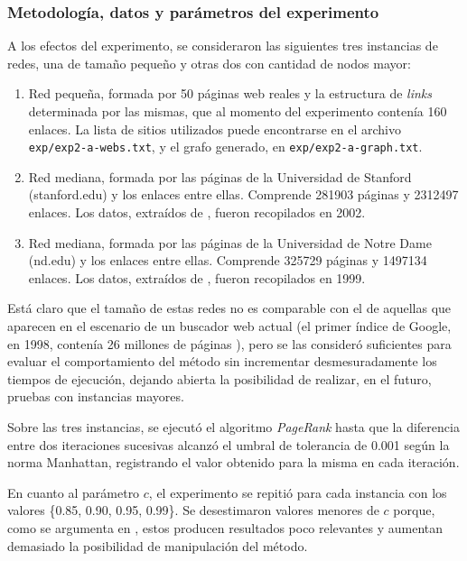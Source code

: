             \subsubsection*{Metodología, datos y parámetros del experimento}
            A los efectos del experimento, se consideraron las siguientes tres instancias de redes, una de tamaño pequeño y otras dos con cantidad de nodos mayor:
            \begin{enumerate}[label=(\alph*)]
                \item Red pequeña, formada por 50 páginas web reales y la estructura de \emph{links} determinada por las mismas, que al momento del experimento contenía 160 enlaces. La lista de sitios utilizados puede encontrarse en el archivo \texttt{exp/exp2-a-webs.txt}, y el grafo generado, en \texttt{exp/exp2-a-graph.txt}.

                \item Red mediana, formada por las páginas de la Universidad de Stanford (stanford.edu) y los enlaces entre ellas. Comprende 281903 páginas y 2312497 enlaces. Los datos, extraídos de \cite{SNAP}, fueron recopilados en 2002.

                \item Red mediana, formada por las páginas de la Universidad de Notre Dame (nd.edu) y los enlaces entre ellas. Comprende 325729 páginas y 1497134 enlaces. Los datos, extraídos de \cite{SNAP}, fueron recopilados en 1999.
            \end{enumerate}

            Está claro que el tamaño de estas redes no es comparable con el de aquellas que aparecen en el escenario de un buscador web actual (el primer índice de Google, en 1998, contenía 26 millones de páginas \cite{Brin1998}), pero se las consideró suficientes para evaluar el comportamiento del método sin incrementar desmesuradamente los tiempos de ejecución, dejando abierta la posibilidad de realizar, en el futuro, pruebas con instancias mayores.

            Sobre las tres instancias, se ejecutó el algoritmo \emph{PageRank} hasta que la diferencia entre dos iteraciones sucesivas alcanzó el umbral de tolerancia de 0.001 según la norma Manhattan, registrando el valor obtenido para la misma en cada iteración.

            En cuanto al parámetro $c$, el experimento se repitió para cada instancia con los valores \{0.85, 0.90, 0.95, 0.99\}. Se desestimaron valores menores de $c$ porque, como se argumenta en \cite{Kamvar2003}, estos producen resultados poco relevantes y aumentan demasiado la posibilidad de manipulación del método.

